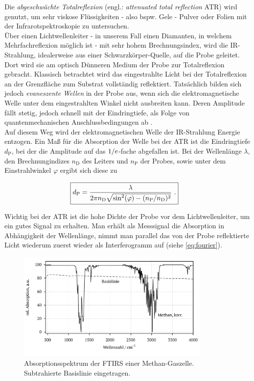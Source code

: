 \documentclass[a4paper,10pt,twocolumn]{article}
\newcommand{\ix}[1]{_\text{#1}}
\newcommand{\tilt}[1]{\textit{#1}}
\newcommand{\euler}{\mathnormal{e}}
\begin{document}
		Die \tilt{abgeschw\"achte Totalreflexion} (engl.: \tilt{attenuated total reflection} ATR) wird genutzt, um sehr viskose Fl\"ussigkeiten - also bspw. Gele - Pulver oder Folien mit der Infrarotspektroskopie zu untersuchen.\\
		\"Uber einen Lichtwellenleiter - in unserem Fall einen Diamanten, in welchem Mehrfachreflexion m\"oglich ist - mit sehr hohem Brechnungsindex, wird die IR-Strahlung, idealerweise aus einer Schwarzk\"orper-Quelle, auf die Probe geleitet. Dort wird sie am optisch D\"unneren Medium der Probe zur Totalreflexion gebracht. Klassisch betrachtet wird das eingestrahlte Licht bei der Totalreflexion an der Grenzfl\"ache zum Substrat vollst\"andig reflektiert. Tats\"achlich bilden sich jedoch \tilt{evaneszente Wellen} in der Probe aus, wenn sich die elektromagnetische Welle unter dem eingestrahlten Winkel nicht ausbreiten kann. Deren Amplitude f\"allt stetig, jedoch schnell mit der Eindringtiefe, als Folge von quantenmechanischen Anschlussbedingungen ab \cite{FTIRInfra}.\\
		Auf diesem Weg wird der elektromagnetischen Welle der IR-Strahlung Energie entzogen. Ein Ma{\ss} f\"ur die Absorption der Welle bei der ATR ist die Eindringtiefe $d\ix{P}$, bei der die Amplitude auf das  $1/\euler$-fache abgefallen ist. Bei der Wellenl\"ange $\lambda$, den Brechnungindizes $n\ix{D}$ des Leiters und $n\ix{P}$ der Probes, sowie unter dem Einstrahlwinkel $\varphi$ ergibt sich diese zu
		
		\begin{align}
		\Aboxed{
			d\ix{P}=\frac{\lambda}{2\pi n\ix{D}\sqrt{\sin^{2}(\varphi)-(n\ix{P}/n\ix{D})^{2}}}\,\, .
		} \label{eq:atr}
		\end{align}
		
		Wichtig bei der ATR ist die hohe Dichte der Probe vor dem Lichtwellenleiter, um ein gutes Signal zu erhalten. Man erh\"alt als Messsignal die Absorption in Abh\"angigkeit der Wellenl\"ange, nimmt man parallel das von der Probe reflektierte Licht wiederum zuerst wieder als Interferogramm auf (siehe \autoref{eq:fourier}).

			\begin{figure}
			\centering
				\includegraphics[width=0.85\textwidth]{Gruppe2A/methan.pdf}
				\caption{Absorptionsspektrum der FTIRS einer Methan-Gaszelle. Subtrahierte Basislinie eingetragen.}
				\label{img:methan}
			\end{figure}
\end{document}
